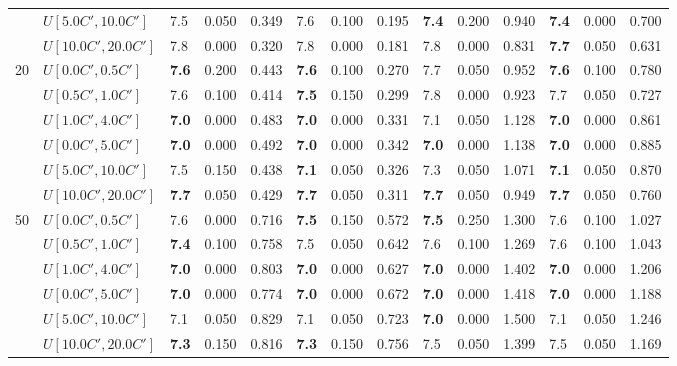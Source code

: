 \begin{table}[h]
{\begin{tabular}{|l|l||l|l|l||l|l|l||l|l|l||l|l|l|}
       & $U[5.0C',10.0C']$ & 7.5 & 0.050 & 0.349 & 7.6 & 0.100 & 0.195 & \textbf{7.4} & 0.200 & 0.940 & \textbf{7.4} & 0.000 & 0.700 \\
       & $U[10.0C',20.0C']$ & 7.8 & 0.000 & 0.320 & 7.8 & 0.000 & 0.181 & 7.8 & 0.000 & 0.831 & \textbf{7.7} & 0.050 & 0.631 \\
      \hline\hline
      \multirow{6}{*}{20} & $U[0.0C',0.5C']$ & \textbf{7.6} & 0.200 & 0.443 & \textbf{7.6} & 0.100 & 0.270 & 7.7 & 0.050 & 0.952 & \textbf{7.6} & 0.100 & 0.780 \\
       & $U[0.5C',1.0C']$ & 7.6 & 0.100 & 0.414 & \textbf{7.5} & 0.150 & 0.299 & 7.8 & 0.000 & 0.923 & 7.7 & 0.050 & 0.727 \\
       & $U[1.0C',4.0C']$ & \textbf{7.0} & 0.000 & 0.483 & \textbf{7.0} & 0.000 & 0.331 & 7.1 & 0.050 & 1.128 & \textbf{7.0} & 0.000 & 0.861 \\
       & $U[0.0C',5.0C']$ & \textbf{7.0} & 0.000 & 0.492 & \textbf{7.0} & 0.000 & 0.342 & \textbf{7.0} & 0.000 & 1.138 & \textbf{7.0} & 0.000 & 0.885 \\
       & $U[5.0C',10.0C']$ & 7.5 & 0.150 & 0.438 & \textbf{7.1} & 0.050 & 0.326 & 7.3 & 0.050 & 1.071 & \textbf{7.1} & 0.050 & 0.870 \\
       & $U[10.0C',20.0C']$ & \textbf{7.7} & 0.050 & 0.429 & \textbf{7.7} & 0.050 & 0.311 & \textbf{7.7} & 0.050 & 0.949 & \textbf{7.7} & 0.050 & 0.760 \\
      \hline\hline
      \multirow{6}{*}{50} & $U[0.0C',0.5C']$ & 7.6 & 0.000 & 0.716 & \textbf{7.5} & 0.150 & 0.572 & \textbf{7.5} & 0.250 & 1.300 & 7.6 & 0.100 & 1.027 \\
       & $U[0.5C',1.0C']$ & \textbf{7.4} & 0.100 & 0.758 & 7.5 & 0.050 & 0.642 & 7.6 & 0.100 & 1.269 & 7.6 & 0.100 & 1.043 \\
       & $U[1.0C',4.0C']$ & \textbf{7.0} & 0.000 & 0.803 & \textbf{7.0} & 0.000 & 0.627 & \textbf{7.0} & 0.000 & 1.402 & \textbf{7.0} & 0.000 & 1.206 \\
       & $U[0.0C',5.0C']$ & \textbf{7.0} & 0.000 & 0.774 & \textbf{7.0} & 0.000 & 0.672 & \textbf{7.0} & 0.000 & 1.418 & \textbf{7.0} & 0.000 & 1.188 \\
       & $U[5.0C',10.0C']$ & 7.1 & 0.050 & 0.829 & 7.1 & 0.050 & 0.723 & \textbf{7.0} & 0.000 & 1.500 & 7.1 & 0.050 & 1.246 \\
       & $U[10.0C',20.0C']$ & \textbf{7.3} & 0.150 & 0.816 & \textbf{7.3} & 0.150 & 0.756 & 7.5 & 0.050 & 1.399 & 7.5 & 0.050 & 1.169 \\
      \hline
      \end{tabular}
      }
      \label{tab:pcpn100ILPVariant}\end{table}
      
